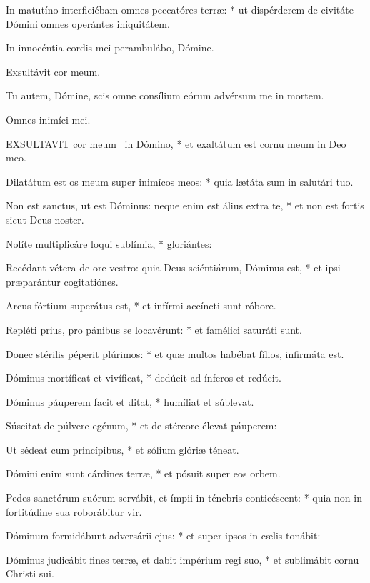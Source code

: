 In matutíno interficiébam omnes peccatóres terræ: * ut dispérderem de civitáte Dómini omnes operántes iniquitátem.

 In innocéntia cordis mei perambulábo, Dómine.

 Exsultávit cor meum. \textdagger


 Tu autem, Dómine, scis omne consílium eórum advérsum me in mortem.

 Omnes inimíci mei.


\lettrine[lines=2]{E}{XSULTAVIT} cor meum \textdagger\ in Dómino, * et exaltátum est cornu meum in Deo meo.

Dilatátum est os meum super inimícos meos: * quia lætáta sum in salutári tuo.

Non est sanctus, ut est Dóminus: neque enim est álius extra te, * et non est fortis sicut Deus noster.

Nolíte multiplicáre loqui sublímia, * gloriántes:

Recédant vétera de ore vestro: quia Deus sciéntiárum, Dóminus est, * et ipsi præparántur cogitatiónes.

Arcus fórtium superátus est, * et infírmi accíncti sunt róbore.

Repléti prius, pro pánibus se locavérunt: * et famélici saturáti sunt.

Donec stérilis péperit plúrimos: * et quæ multos habébat fílios, infirmáta est.

Dóminus mortíficat et vivíficat, * dedúcit ad ínferos et redúcit.

Dóminus páuperem facit et ditat, * humíliat et súblevat.

Súscitat de púlvere egénum, * et de stércore élevat páuperem:

Ut sédeat cum princípibus, * et sólium glóriæ téneat.

Dómini enim sunt cárdines terræ, * et pósuit super eos orbem.

Pedes sanctórum suórum servábit, et ímpii in ténebris conticéscent: * quia non in fortitúdine sua roborábitur vir.

Dóminum formidábunt adversárii ejus: * et super ipsos in cælis tonábit:

Dóminus judicábit fines terræ, et dabit impérium regi suo, * et sublimábit cornu Christi sui.

